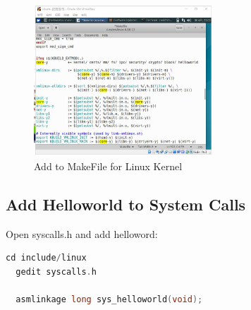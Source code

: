 \documentclass[12pt,a4paper]{article}
\begin{document}
	\begin{figure}[H]
	\centering
	\includegraphics[width= 0.6\textwidth]{./fig/8_addto_Makefile.jpg}
	\caption{Add to MakeFile for Linux Kernel}
	\label{fig:linux kernel make file}
    \end{figure}

\subsection{Add Helloworld to System Calls}
Open syscalls.h and add helloword:

\begin{lstlisting}[language = C]
  cd include/linux
  gedit syscalls.h
  
  asmlinkage long sys_helloworld(void);
  
\end{lstlisting}
\end{document}
